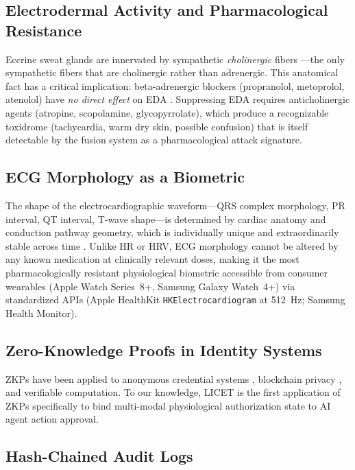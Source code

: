 \documentclass[12pt,a4paper]{article}
\begin{document}
\subsection{Electrodermal Activity and Pharmacological Resistance}

Eccrine sweat glands are innervated by sympathetic \emph{cholinergic} fibers
\cite{fowles1986eda, venables1980eda}---the only sympathetic fibers that are
cholinergic rather than adrenergic. This anatomical fact has a critical
implication: beta-adrenergic blockers (propranolol, metoprolol, atenolol)
have \emph{no direct effect} on EDA \cite{brantigan1982}. Suppressing EDA
requires anticholinergic agents (atropine, scopolamine, glycopyrrolate), which
produce a recognizable toxidrome (tachycardia, warm dry skin, possible
confusion) that is itself detectable by the fusion system as a pharmacological
attack signature.

\subsection{ECG Morphology as a Biometric}

The shape of the electrocardiographic waveform---QRS complex morphology, PR
interval, QT interval, T-wave shape---is determined by cardiac anatomy and
conduction pathway geometry, which is individually unique and
extraordinarily stable across time \cite{israel2005ecg}. Unlike HR or HRV,
ECG morphology cannot be altered by any known medication at clinically relevant
doses, making it the most pharmacologically resistant physiological biometric
accessible from consumer wearables (Apple Watch Series~8+, Samsung Galaxy
Watch~4+) via standardized APIs (Apple HealthKit \texttt{HKElectrocardiogram}
at 512~Hz; Samsung Health Monitor).

\subsection{Zero-Knowledge Proofs in Identity Systems}

ZKPs have been applied to anonymous credential systems \cite{camenisch1997},
blockchain privacy \cite{sasson2014zerocash}, and verifiable computation. To
our knowledge, LICET is the first application of ZKPs specifically to bind
multi-modal physiological authorization state to AI agent action approval.

\subsection{Hash-Chained Audit Logs}
\end{document}
